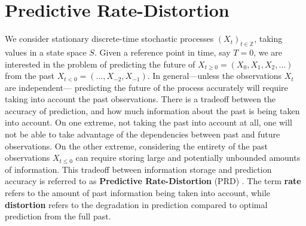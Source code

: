 \documentclass[entropy,article,submit,moreauthors,pdftex,10pt,a4paper]{Definitions/mdpi}
\newcommand{\key}{\textbf}
\begin{document}




\section{Predictive Rate-Distortion}\label{sec:background}

We consider stationary discrete-time stochastic processes $(X_t)_{t \in \mathbb{Z}}$, taking values in a state space $S$.
Given a reference point in time, say $T=0$, we are interested in the problem of predicting the future of $X_{t\geq 0} = (X_0, X_1, X_2, ...)$ from the past $X_{t< 0} = (..., X_{-2}, X_{-1})$.
In general---unless the observations $X_t$ are independent--- predicting the future of the process accurately will require taking into account the past observations.
There is a tradeoff between the accuracy of prediction, and how much information about the past is being taken into account.
On one extreme, not taking the past into account at all, one will not be able to take advantage of the dependencies between past and future observations.
On the other extreme, considering the entirety of the past observations $X_{t \leq 0}$ can require storing large and potentially unbounded amounts of information.
This tradeoff between information storage and prediction accuracy is referred to as \key{Predictive Rate-Distortion} (PRD) \citep{marzen-predictive-2016}.
The term \key{rate} refers to the amount of past information being taken into account, while \key{distortion} refers to the degradation in prediction compared to optimal prediction from the full past.
\end{document}
